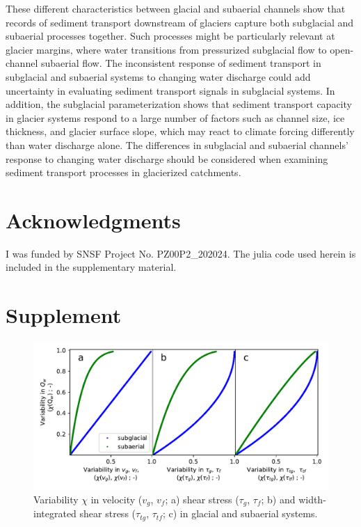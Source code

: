 \documentclass[11pt]{article}
\begin{document}
\begin{spacing}{1}
  These different characteristics between glacial and subaerial channels show that records of sediment transport downstream of glaciers capture both subglacial and subaerial processes together.
  Such processes might be particularly relevant at glacier margins, where water transitions from pressurized subglacial flow to open-channel subaerial flow.
  The inconsistent response of sediment transport in subglacial and subaerial systems to changing water discharge could add uncertainty in evaluating  sediment transport signals in subglacial systems.
  In addition, the subglacial parameterization shows that sediment transport capacity in glacier systems respond to a large number of factors such as channel size, ice thickness, and glacier surface slope, which may react to climate forcing differently than water discharge alone. 
  The differences in subglacial and subaerial channels' response to changing water discharge should be considered when examining sediment transport processes in glacierized catchments.
  
  \section{Acknowledgments}
  
  I was funded by SNSF Project No. PZ00P2\_202024.
  The julia code used herein is included in the supplementary material.
  
  
\end{spacing}





\section{Supplement}

\begin{center}
  \begin{figure}[H]
    \includegraphics[width=0.7\linewidth]{multi_run_vars.pdf}
    \caption{Variability $\chi$ in velocity ($v_g$, $v_f$; a) shear stress ($\tau_g$, $\tau_f$; b) and width-integrated shear stress ($\tau_{tg}$, $\tau_{tf}$; c)  in glacial and subaerial systems. }
    \label{fig:gammas}
  \end{figure}
\end{center}
\end{document}
